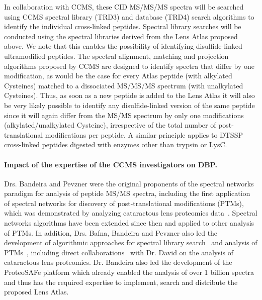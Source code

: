 \documentclass[arial,11pt]{article}
\begin{document}
In collaboration with CCMS, these CID MS/MS/MS spectra will be searched using CCMS spectral library (TRD3) and database (TRD4) search algorithms to identify the individual cross-linked peptides. Spectral library searches will be conducted using the spectral libraries derived from the Lens Atlas proposed above. We note that this enables the possibility of identifying disulfide-linked ultramodified peptides. The spectral alignment, matching and projection algorithms proposed by CCMS are designed to identify spectra that differ by one modification, as would be the case for every Atlas peptide (with alkylated Cysteines) matched to a dissociated MS/MS/MS spectrum (with unalkylated Cysteines). Thus, as soon as a new peptide is added to the Lens Atlas it will also be very likely possible to identify any disulfide-linked version of the same peptide since it will again differ from the MS/MS spectrum by only one modifications (alkylated/unalkylated Cysteine), irrespective of the total number of post-translational modifications per peptide. A similar principle applies to DTSSP cross-linked peptides digested with enzymes other than trypsin or LysC.

\paragraph{Impact of the expertise of the CCMS investigators on DBP.} Drs. Bandeira and Pevzner were the original proponents of the spectral networks paradigm for analysis of peptide MS/MS spectra, including the first application of spectral networks for discovery of post-translational modifications (PTMs), which was demonstrated by analyzing cataractous lens proteomics data~\cite{bandeira07pnas}. Spectral networks algorithms have been extended since then and applied to other analysis of PTMs. In addition, Drs. Bafna, Bandeira and Pevzner also led the development of algorithmic approaches for spectral library search~\cite{wang10} and analysis of PTMs~\cite{tsur05,na11}, including direct collaborations~\cite{Wilmarth06,tanner08} with Dr. David on the analysis of cataractous lens proteomics. Dr. Bandeira also led the development of the ProteoSAFe platform which already enabled the analysis of over 1 billion spectra and thus has the required expertise to implement, search and distribute the proposed Lens Atlas.
\end{document}
